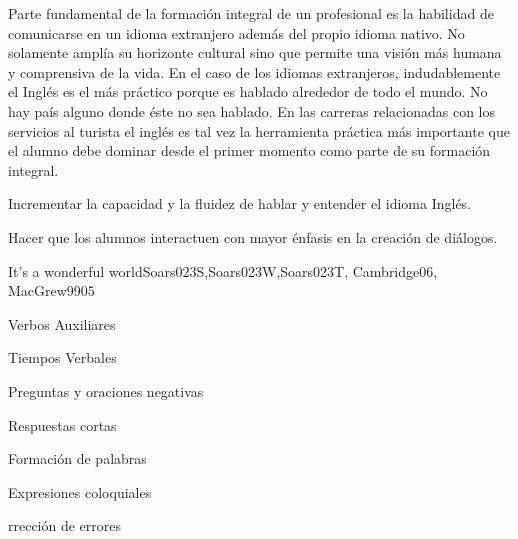 \begin{syllabus}


\begin{justification}
Parte fundamental de la formación integral de un profesional es la 
habilidad de comunicarse en un idioma extranjero además del propio idioma 
nativo. No solamente amplía su horizonte cultural sino que permite una visión 
más humana y comprensiva de la vida. En el caso de los idiomas extranjeros, 
indudablemente el Inglés es el más práctico porque es hablado alrededor de 
todo el mundo. No hay país alguno donde éste no sea hablado. En las carreras 
relacionadas con los servicios al turista el inglés es tal vez la herramienta 
práctica más importante que el alumno debe dominar desde el primer momento 
como parte de su formación integral.
\end{justification}

\begin{goals}
\item Incrementar la capacidad y la fluidez de hablar y entender el idioma Inglés.
\item Hacer que los alumnos interactuen con mayor énfasis en la creación de diálogos.
\end{goals}

\begin{competences}
    \item {}
\end{competences}

\begin{outcomes}
\item {}
\item {}
\end{outcomes}

\begin{unit}{It's a wonderful world}{Soars023S,Soars023W,Soars023T, Cambridge06, MacGrew99}{0}{5}
   \begin{topics}
      \item Verbos Auxiliares
      \item Tiempos Verbales 
      \item Preguntas y oraciones negativas
      \item Respuestas cortas 
      \item Formación de palabras
      \item Expresiones coloquiales
      \item rrección de errores 
   \end{topics}


\end{unit}
\end{syllabus}
